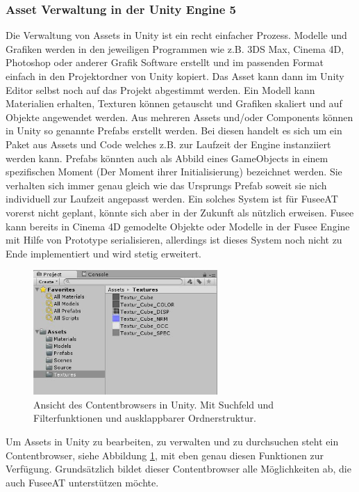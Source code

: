 \documentclass[pagesize, paper=a4, fontsize=12pt, titlepage=true, headings=small, headnosepline, abstractoff, liststotoc, nochapterprefix, plainheadsepline, twoside]{scrreprt}
\begin{document}
\subsubsection{Asset Verwaltung in der Unity Engine 5}
Die Verwaltung von Assets in Unity ist ein recht einfacher Prozess. Modelle und Grafiken werden in den jeweiligen Programmen wie z.B. 3DS Max, Cinema 4D, Photoshop oder anderer Grafik Software erstellt und im passenden Format einfach in den Projektordner von Unity kopiert. Das Asset kann dann im Unity Editor selbst noch auf das Projekt abgestimmt werden. Ein Modell kann Materialien erhalten, Texturen können getauscht und Grafiken skaliert und auf Objekte angewendet werden. Aus mehreren Assets und/oder Components können in Unity so genannte Prefabs erstellt werden. Bei diesen handelt es sich um ein Paket aus Assets und Code welches z.B. zur Laufzeit der Engine instanziiert werden kann. Prefabs könnten auch als Abbild eines GameObjects in einem spezifischen Moment (Der Moment ihrer Initialisierung) bezeichnet werden. Sie verhalten sich immer genau gleich wie das Ursprungs Prefab soweit sie nich individuell zur Laufzeit angepasst werden. Ein solches System ist für FuseeAT vorerst nicht geplant, könnte sich aber in der Zukunft als nützlich erweisen. Fusee kann bereits in Cinema 4D gemodelte Objekte oder Modelle in der Fusee Engine mit Hilfe von Prototype serialisieren, allerdings ist dieses System noch nicht zu Ende implementiert und wird stetig erweitert.

\begin{figure}[ht]
	\centering
	\includegraphics[width=7cm]{Bilder/uContentbrowser.jpg}
	\caption{Ansicht des Contentbrowsers in Unity. Mit Suchfeld und Filterfunktionen und ausklappbarer Ordnerstruktur.}
	\label{UnityContentbrowser}
\end{figure}
Um Assets in Unity zu bearbeiten, zu verwalten und zu durchsuchen steht ein Contentbrowser, siehe Abbildung \ref{UnityContentbrowser}, mit eben genau diesen Funktionen zur Verfügung. Grundsätzlich bildet dieser Contentbrowser alle Möglichkeiten ab, die auch FuseeAT unterstützen möchte.
\end{document}
